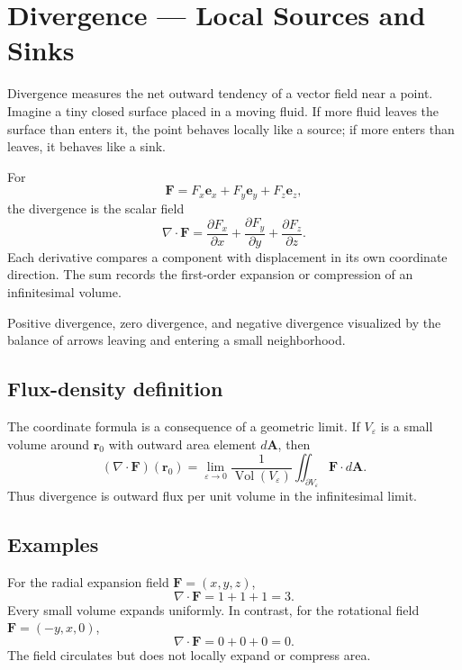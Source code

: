 \section{Divergence --- Local Sources and Sinks}
\label{sec:divergence}

Divergence measures the net outward tendency of a vector field near a point. Imagine a tiny closed surface placed in a moving fluid. If more fluid leaves the surface than enters it, the point behaves locally like a source; if more enters than leaves, it behaves like a sink.

For
\[
\mathbf F=F_x\mathbf e_x+F_y\mathbf e_y+F_z\mathbf e_z,
\]
the divergence is the scalar field
\[
\boxed{\nabla\cdot\mathbf F=
\frac{\partial F_x}{\partial x}+
\frac{\partial F_y}{\partial y}+
\frac{\partial F_z}{\partial z}.}
\]
Each derivative compares a component with displacement in its own coordinate direction. The sum records the first-order expansion or compression of an infinitesimal volume.

\begin{bookfigure}{Positive divergence, zero divergence, and negative divergence visualized by the balance of arrows leaving and entering a small neighborhood.}

\label{fig:divergence-source-sink}
\end{bookfigure}

\subsection{Flux-density definition}

The coordinate formula is a consequence of a geometric limit. If $V_\varepsilon$ is a small volume around $\mathbf r_0$ with outward area element $d\mathbf A$, then
\[
\boxed{
(\nabla\cdot\mathbf F)(\mathbf r_0)=
\lim_{\varepsilon\to0}
\frac{1}{\operatorname{Vol}(V_\varepsilon)}
\iint_{\partial V_\varepsilon}\mathbf F\cdot d\mathbf A.}
\]
Thus divergence is outward flux per unit volume in the infinitesimal limit.

\subsection{Examples}

For the radial expansion field $\mathbf F=(x,y,z)$,
\[
\nabla\cdot\mathbf F=1+1+1=3.
\]
Every small volume expands uniformly. In contrast, for the rotational field $\mathbf F=(-y,x,0)$,
\[
\nabla\cdot\mathbf F=0+0+0=0.
\]
The field circulates but does not locally expand or compress area.

